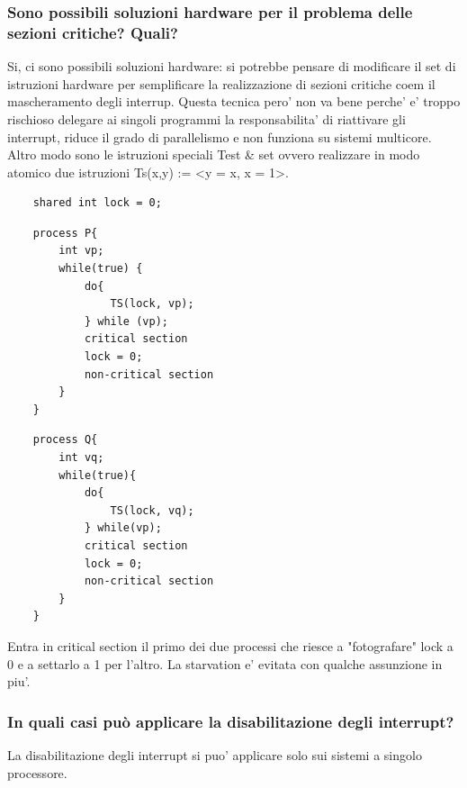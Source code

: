 \documentclass{article}
\begin{document}
\subsubsection{Sono possibili soluzioni hardware per il problema delle sezioni critiche? Quali?}
Si, ci sono possibili soluzioni hardware: si potrebbe pensare di modificare il
set di istruzioni hardware per semplificare la realizzazione di sezioni
critiche coem il mascheramento degli interrup. Questa tecnica pero' non va bene
perche' e' troppo rischioso delegare ai singoli programmi la responsabilita' di
riattivare gli interrupt, riduce il grado di parallelismo e non funziona su
sistemi multicore. Altro modo sono le istruzioni speciali Test \& set ovvero
realizzare in modo atomico due istruzioni Ts(x,y) := <y = x, x = 1>.

\begin{verbatim}
    shared int lock = 0;
\end{verbatim}
\vspace{0.25cm}
\noindent
\begin{minipage}[t]{0.48\textwidth}
    \begin{verbatim}
    process P{
        int vp;
        while(true) {
            do{
                TS(lock, vp);
            } while (vp);
            critical section
            lock = 0;
            non-critical section
        }
    }
\end{verbatim}
\end{minipage}%
\hfill
\begin{minipage}[t]{0.48\textwidth}
    \begin{verbatim}
    process Q{
        int vq;
        while(true){
            do{
                TS(lock, vq);
            } while(vp);
            critical section
            lock = 0;
            non-critical section
        }
    }
\end{verbatim}
\end{minipage}

Entra in critical section il primo dei due processi che riesce a "fotografare"
lock a 0 e a settarlo a 1 per l'altro. La starvation e' evitata con qualche
assunzione in piu'.

\subsubsection{In quali casi può applicare la disabilitazione degli interrupt?}
La disabilitazione degli interrupt si puo' applicare solo sui sistemi a singolo
processore.
\end{document}
